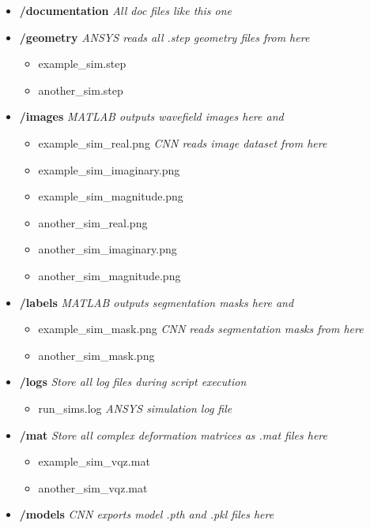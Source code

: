 \documentclass[11pt,letterpaper]{article}
\begin{document}
\begin{itemize}
\begin{itemize}
\begin{itemize}
				\end{itemize}
				\item[] \textbf{/documentation} \hfill \textit{All doc files like this one}
				\item[] \textbf{/geometry} \hfill \textit{ANSYS reads all .step geometry files from here}
				\begin{itemize}
					\item[] example\_sim.step
					\item[] another\_sim.step
				\end{itemize}
				\item[] \textbf{/images} \hfill \textit{MATLAB outputs wavefield images here and}
				\begin{itemize}
					\item[] example\_sim\_real.png \hfill \textit{CNN reads image dataset from here}
					\item[] example\_sim\_imaginary.png
					\item[] example\_sim\_magnitude.png
					\item[] another\_sim\_real.png 
					\item[] another\_sim\_imaginary.png
					\item[] another\_sim\_magnitude.png
				\end{itemize}
				\item[] \textbf{/labels} \hfill \textit{MATLAB outputs segmentation masks here and}
				\begin{itemize}
					\item[] example\_sim\_mask.png \hfill \textit{CNN reads segmentation masks from here}
					\item[] another\_sim\_mask.png
				\end{itemize}
				\item[] \textbf{/logs} \hfill \textit{Store all log files during script execution}
				\begin{itemize}
					\item[] run\_sims.log \hfill \textit{ANSYS simulation log file}
				\end{itemize}
				\item[] \textbf{/mat} \hfill \textit{Store all complex deformation matrices as .mat files here}
				\begin{itemize}
					\item[] example\_sim\_vqz.mat
					\item[] another\_sim\_vqz.mat
				\end{itemize}
				\item[] \textbf{/models} \hfill \textit{CNN exports model .pth and .pkl files here}

\end{itemize}
\end{itemize}
\end{document}
